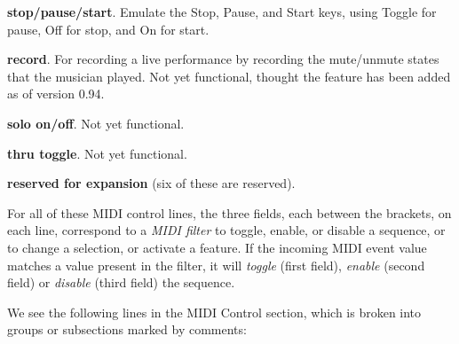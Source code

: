 \begin{enumber}
         \begin{enumber}
            \item \textbf{stop/pause/start}.  Emulate the Stop, Pause, and
               Start keys, using Toggle for pause, Off for stop, and On for
               start.
            \item \textbf{record}.  For recording a live performance by
               recording the mute/unmute states that the musician played.
               Not yet functional, thought the feature has been added as of
               version 0.94.
            \item \textbf{solo on/off}.
               Not yet functional.
            \item \textbf{thru toggle}.
               Not yet functional.
            \item \textbf{reserved for expansion} (six of these are reserved).
         \end{enumber}
   \end{enumber}

   For all of these MIDI control lines,
   the three fields, each between the brackets, on each line, correspond to a
   \textsl{MIDI filter} to toggle, enable, or disable a sequence, or to
   change a selection, or activate a feature.
   If the incoming MIDI event value matches a value present in the filter, it
   will \textsl{toggle} (first field), \textsl{enable} (second field) or
   \textsl{disable} (third field) the sequence.

   We see the following lines in the MIDI Control section, which is broken
   into groups or subsections marked by comments:

